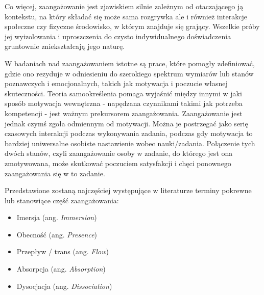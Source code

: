 Co więcej, zaangażowanie jest zjawiskiem silnie zależnym od otaczającego ją kontekstu, na który
składać się może sama rozgrywka ale i również interakcje społeczne czy fizyczne środowisko, w
którym znajduje się grający. Wszelkie próby jej wyizolowania i uproszczenia do czysto indywidualnego
doświadczenia gruntownie zniekształcają jego naturę.

W badaniach nad zaangażowaniem istotne są prace, które pomogły zdefiniować, gdzie ono rezyduje w
odniesieniu do szerokiego spektrum wymiarów lub stanów poznawczych i emocjonalnych, takich jak motywacja
i poczucie własnej skuteczności. Teoria samookreślenia pomaga wyjaśnić między innymi w jaki
sposób motywacja wewnętrzna - napędzana czynnikami takimi jak potrzeba kompetencji - jest ważnym
prekursorem zaangażowania. Zaangażowanie jest jednak czymś zgoła odmiennym od motywacji\cite{measuring_engagement}.
Można je postrzegać jako serię czasowych interakcji podczas wykonywania zadania, podczas gdy motywacja to
bardziej uniwersalne osobiste nastawienie wobec nauki/zadania. Połączenie tych dwóch stanów, czyli
zaangażowanie osoby w zadanie, do którego jest ona zmotywowana, może skutkować poczuciem satysfakcji
i chęci ponownego zaangażowania się w to zadanie\cite{measuring_engagement}.

Przedstawione zostaną najczęściej występujące w literaturze terminy pokrewne lub stanowiące część
zaangażowania:

\begin{itemize}
      \item Imersja (ang. \textit{Immersion})
      \item Obecność (ang. \textit{Presence})
      \item Przepływ / trans  (ang. \textit{Flow})
      \item Absorpcja (ang. \textit{Absorption})
      \item Dysocjacja (ang. \textit{Dissociation})
\end{itemize}

